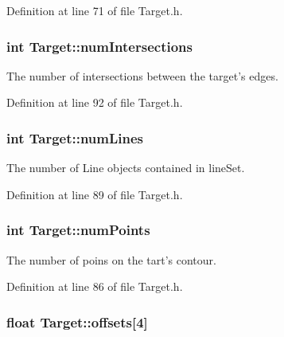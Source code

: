 Definition at line 71 of file Target.h.

\hypertarget{classTarget_a8299a806d41327ee1827fc0f0b0b2131}{
\subsubsection[{numIntersections}]{\setlength{\rightskip}{0pt plus 5cm}int {\bf Target::numIntersections}}}
\label{classTarget_a8299a806d41327ee1827fc0f0b0b2131}


The number of intersections between the target's edges. 



Definition at line 92 of file Target.h.

\hypertarget{classTarget_ae66edfe3234fad4f2e46c2975b29ab89}{
\subsubsection[{numLines}]{\setlength{\rightskip}{0pt plus 5cm}int {\bf Target::numLines}}}
\label{classTarget_ae66edfe3234fad4f2e46c2975b29ab89}


The number of Line objects contained in lineSet. 



Definition at line 89 of file Target.h.

\hypertarget{classTarget_af7e7aa3898edd34429c99d391e7fe995}{
\subsubsection[{numPoints}]{\setlength{\rightskip}{0pt plus 5cm}int {\bf Target::numPoints}}}
\label{classTarget_af7e7aa3898edd34429c99d391e7fe995}


The number of poins on the tart's contour. 



Definition at line 86 of file Target.h.

\hypertarget{classTarget_af1714dc10beafcd323003e43d787f7ab}{
\subsubsection[{offsets}]{\setlength{\rightskip}{0pt plus 5cm}float {\bf Target::offsets}\mbox{[}4\mbox{]}}}
\label{classTarget_af1714dc10beafcd323003e43d787f7ab}


